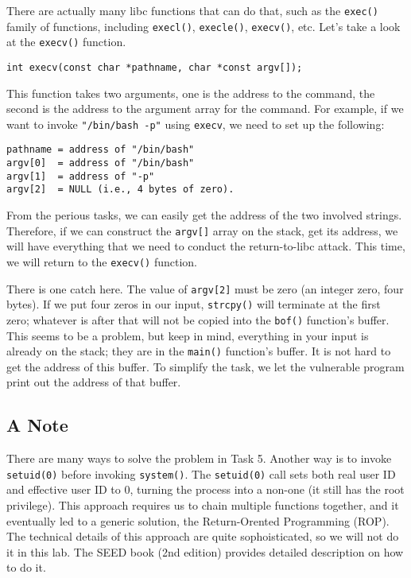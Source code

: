 There are actually many libc functions that can do that, such as 
the \texttt{exec()} family  of functions, including \texttt{execl()},
\texttt{execle()}, \texttt{execv()}, etc. Let's take a look at the
\texttt{execv()} function.

\begin{lstlisting}
int execv(const char *pathname, char *const argv[]);
\end{lstlisting}
 
This function takes two arguments, one is the address to the command, the 
second is the address to the argument array for the command. For example, if we 
want to invoke \texttt{"/bin/bash -p"} using \texttt{execv}, we need to 
set up the following:

\begin{lstlisting}
pathname = address of "/bin/bash" 
argv[0]  = address of "/bin/bash"
argv[1]  = address of "-p"
argv[2]  = NULL (i.e., 4 bytes of zero).
\end{lstlisting}
 
From the perious tasks, we can easily get the address of the two involved 
strings. Therefore, if we can construct the \texttt{argv[]} array on the stack, 
get its address, we will have everything that we need to conduct the 
return-to-libc attack. This time, we will return to the \texttt{execv()} function. 

There is one catch here. The value of \texttt{argv[2]} must be zero (an integer zero, 
four bytes). If we put four zeros in our input, \texttt{strcpy()} will terminate
at the first zero; whatever is after that will not be copied into 
the \texttt{bof()} function's buffer. This seems to be a problem, but keep
in mind, everything in your input is already on the stack; they are in
the \texttt{main()} function's buffer. It is not hard to get the 
address of this buffer. To simplify the task, we let the 
vulnerable program print out the address of that buffer.


\subsection{A Note}

There are many ways to solve the problem in Task 5. 
Another way is to invoke \texttt{setuid(0)} before 
invoking \texttt{system()}. The \texttt{setuid(0)} call sets both real user ID and  
effective user ID to 0, turning the process into a non-\setuid one (it still has 
the root privilege). This approach requires us to chain multiple functions
together, and it eventually led to a generic solution, the Return-Orented Programming (ROP). 
The technical details of this approach are quite sophoisticated, so we will not 
do it in this lab. The SEED book (2nd edition) provides detailed 
description on how to do it. 




